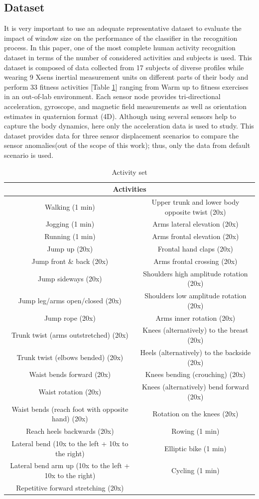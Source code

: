 \subsection{Dataset} \label{sec:dataset}
It is very important to use an adequate representative dataset to 
evaluate the impact of window size on the performance of the classifier 
in the recognition process. In this paper, one of the most complete 
human activity recognition dataset \cite{banos2012benchmark} in terms 
of the number of considered activities and subjects is used. This 
dataset is composed of data collected from 17 subjects of diverse 
profiles while wearing 9 Xsens inertial measurement units on different 
parts of their body and perform 33 fitness activities [Table 
\ref{tab:Activites}] ranging from Warm up to fitness exercises in an 
out-of-lab environment. Each sensor node provides tri-directional 
acceleration, gyroscope, and magnetic field measurements as well as 
orientation estimates in quaternion format (4D). Although using several 
sensors help to capture the body dynamics, here only the acceleration 
data is used to study. This dataset provides data for three sensor 
displacement scenarios to compare the sensor anomalies(out of the scope 
of this work); thus, only the data from default scenario is used.

\begin{table}[h!]
\tiny  
  \centering
\begin{tabular}{|c|c|}
\hline 
\multicolumn{2}{|c|}{Activities}\tabularnewline
\hline 
\hline 
Walking (1 min) & Upper trunk and lower body opposite twist (20x)\tabularnewline
\hline 
Jogging (1 min) & Arms lateral elevation (20x)\tabularnewline
\hline 
Running (1 min) & Arms frontal elevation (20x)\tabularnewline
\hline 
Jump up (20x) & Frontal hand claps (20x)\tabularnewline
\hline 
Jump front \& back (20x) & Arms frontal crossing (20x)\tabularnewline
\hline 
Jump sideways (20x) & Shoulders high amplitude rotation (20x)\tabularnewline
\hline 
Jump leg/arms open/closed (20x) & Shoulders low amplitude rotation (20x)\tabularnewline
\hline 
Jump rope (20x) & Arms inner rotation (20x)\tabularnewline
\hline 
Trunk twist (arms outstretched) (20x) & Knees (alternatively) to the breast (20x)\tabularnewline
\hline 
Trunk twist (elbows bended) (20x) & Heels (alternatively) to the backside (20x)\tabularnewline
\hline 
Waist bends forward (20x) & Knees bending (crouching) (20x)\tabularnewline
\hline 
Waist rotation (20x) & Knees (alternatively) bend forward (20x)\tabularnewline
\hline 
Waist bends (reach foot with opposite hand) (20x) & Rotation on the knees (20x)\tabularnewline
\hline 
Reach heels backwards (20x) & Rowing (1 min)\tabularnewline
\hline 
Lateral bend (10x to the left + 10x to the right) & Elliptic bike (1 min)\tabularnewline
\hline 
Lateral bend arm up (10x to the left + 10x to the right) & Cycling (1 min)\tabularnewline
\hline 
Repetitive forward stretching (20x) & \tabularnewline
\hline 
\end{tabular}

        \caption{Activity set }
        \label{tab:Activites}

\end{table} 

